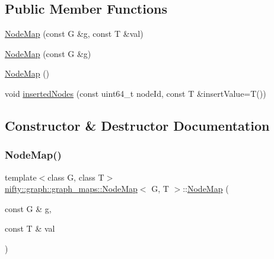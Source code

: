 \subsection*{Public Member Functions}
\begin{DoxyCompactItemize}
\item 
\hyperlink{structnifty_1_1graph_1_1graph__maps_1_1NodeMap_a0580548b98c3e769227111e081c0b7a6}{Node\+Map} (const G \&g, const T \&val)
\item 
\hyperlink{structnifty_1_1graph_1_1graph__maps_1_1NodeMap_a759dd195fba1b36d638635e10677e759}{Node\+Map} (const G \&g)
\item 
\hyperlink{structnifty_1_1graph_1_1graph__maps_1_1NodeMap_ac56649d6162ce84c37ffa6c096954bea}{Node\+Map} ()
\item 
void \hyperlink{structnifty_1_1graph_1_1graph__maps_1_1NodeMap_a63aea0a762e0ec912e8c9ef357268d09}{inserted\+Nodes} (const uint64\+\_\+t node\+Id, const T \&insert\+Value=T())
\end{DoxyCompactItemize}


\subsection{Constructor \& Destructor Documentation}
\mbox{\label{structnifty_1_1graph_1_1graph__maps_1_1NodeMap_a0580548b98c3e769227111e081c0b7a6}} 
\subsubsection{\texorpdfstring{Node\+Map()}{NodeMap()}\hspace{0.1cm}{\footnotesize\ttfamily [1/3]}}
{\footnotesize\ttfamily template$<$class G, class T$>$ \\
\hyperlink{structnifty_1_1graph_1_1graph__maps_1_1NodeMap}{nifty\+::graph\+::graph\+\_\+maps\+::\+Node\+Map}$<$ G, T $>$\+::\hyperlink{structnifty_1_1graph_1_1graph__maps_1_1NodeMap}{Node\+Map} (\begin{DoxyParamCaption}\item[{const G \&}]{g,  }\item[{const T \&}]{val }\end{DoxyParamCaption})\hspace{0.3cm}{\ttfamily [inline]}}

